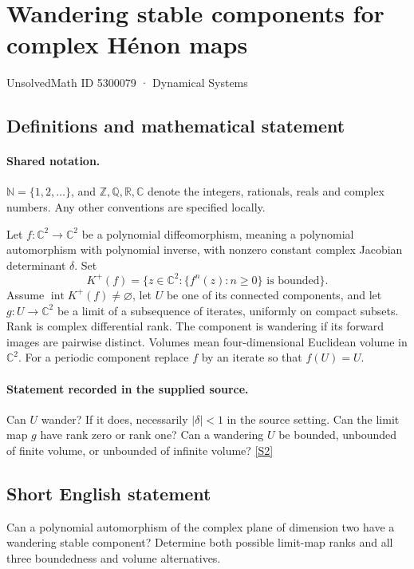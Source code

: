 \documentclass[11pt]{article}
\newcommand{\sref}[2]{\hyperlink{source:#1:#2}{[S#2]}}
\begin{document}
\setcounter{section}{5300078}
\section{Wandering stable components for complex Hénon maps}\label{5300079}
{\small\sffamily UnsolvedMath ID 5300079 · Dynamical Systems}
\subsection{Definitions and mathematical statement}

\paragraph{Shared notation.}$\mathbb N=\{1,2,\ldots\}$, and $\mathbb Z,\mathbb Q,\mathbb R,\mathbb C$ denote the integers, rationals, reals and complex numbers. Any other conventions are specified locally.


Let $f:\mathbb C^2\to\mathbb C^2$ be a polynomial diffeomorphism, meaning a polynomial automorphism with polynomial inverse, with nonzero constant complex Jacobian determinant $\delta$. Set
\[K^+(f)=\{z\in\mathbb C^2:\{f^n(z):n\geq0\}\text{ is bounded}\}.\]
Assume $\operatorname{int}K^+(f)\ne\varnothing$, let $U$ be one of its connected components, and let $g:U\to\mathbb C^2$ be a limit of a subsequence of iterates, uniformly on compact subsets. Rank is complex differential rank. The component is wandering if its forward images are pairwise distinct. Volumes mean four-dimensional Euclidean volume in $\mathbb C^2$. For a periodic component replace $f$ by an iterate so that $f(U)=U$.
\paragraph{Statement recorded in the supplied source.}
Can $U$ wander? If it does, necessarily $|\delta|<1$ in the source setting. Can the limit map $g$ have rank zero or rank one? Can a wandering $U$ be bounded, unbounded of finite volume, or unbounded of infinite volume? \sref{5300079}{2}
\subsection{Short English statement}
Can a polynomial automorphism of the complex plane of dimension two have a wandering stable component? Determine both possible limit-map ranks and all three boundedness and volume alternatives.
\end{document}
